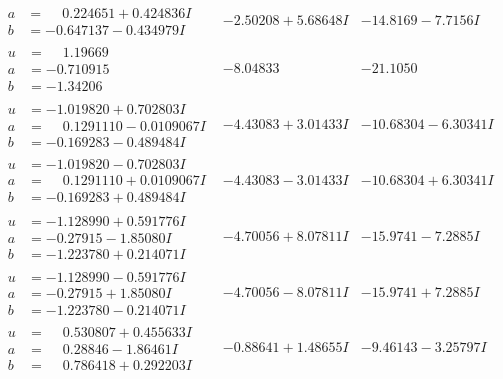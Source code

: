 \documentclass[1p]{elsarticle_modified}
\theoremstyle{definition}
\begin{document}
$$\begin{array}{c|c|c}
\begin{aligned}
a &= \phantom{-}0.224651 + 0.424836 I \\
b &= -0.647137 - 0.434979 I\end{aligned}
 & -2.50208 + 5.68648 I & -14.8169 - 7.7156 I \\ \hline\begin{aligned}
u &= \phantom{-}1.19669\phantom{ +0.000000I} \\
a &= -0.710915\phantom{ +0.000000I} \\
b &= -1.34206\phantom{ +0.000000I}\end{aligned}
 & -8.04833\phantom{ +0.000000I} & -21.1050\phantom{ +0.000000I} \\ \hline\begin{aligned}
u &= -1.019820 + 0.702803 I \\
a &= \phantom{-}0.1291110 - 0.0109067 I \\
b &= -0.169283 - 0.489484 I\end{aligned}
 & -4.43083 + 3.01433 I & -10.68304 - 6.30341 I \\ \hline\begin{aligned}
u &= -1.019820 - 0.702803 I \\
a &= \phantom{-}0.1291110 + 0.0109067 I \\
b &= -0.169283 + 0.489484 I\end{aligned}
 & -4.43083 - 3.01433 I & -10.68304 + 6.30341 I \\ \hline\begin{aligned}
u &= -1.128990 + 0.591776 I \\
a &= -0.27915 - 1.85080 I \\
b &= -1.223780 + 0.214071 I\end{aligned}
 & -4.70056 + 8.07811 I & -15.9741 - 7.2885 I \\ \hline\begin{aligned}
u &= -1.128990 - 0.591776 I \\
a &= -0.27915 + 1.85080 I \\
b &= -1.223780 - 0.214071 I\end{aligned}
 & -4.70056 - 8.07811 I & -15.9741 + 7.2885 I \\ \hline\begin{aligned}
u &= \phantom{-}0.530807 + 0.455633 I \\
a &= \phantom{-}0.28846 - 1.86461 I \\
b &= \phantom{-}0.786418 + 0.292203 I\end{aligned}
 & -0.88641 + 1.48655 I & -9.46143 - 3.25797 I \\ \hline\begin{aligned}

\end{aligned}
\end{array}$$
\end{document}
